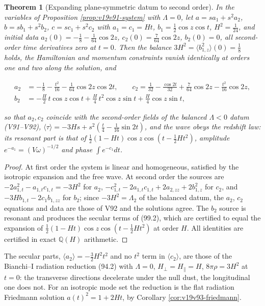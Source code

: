 \documentclass[11pt]{article}
\newtheorem{theorem}{Theorem}[section]
\theoremstyle{remark}
\begin{document}
\begin{theorem}[Expanding plane-symmetric datum to second order]
\label{thm:v19v96-evolution}
In the variables of Proposition \ref{prop:v19v91-system} with
\(\Lambda=0\), let \(a=sa_1+s^2a_2\), \(b=sb_1+s^2b_2\), \(c=sc_1+s^2c_2\)
with \(a_1=c_1=Ht\), \(b_1=\tfrac12\cos z\cos t\), \(H^2=\tfrac1{24}\),
and initial data \(a_2(0)=-\tfrac18-\tfrac1{64}\cos2z\),
\(c_2(0)=\tfrac7{64}\cos2z\), \(b_2(0)=0\), all second-order time
derivatives zero at \(t=0\).  Then the balance \(3H^2=\langle b_{1,z}^2\rangle(0)=\tfrac18\)
holds, the Hamiltonian and momentum constraints vanish identically at
orders one and two along the solution, and

\[
\begin{aligned}
 a_2&=-\frac18-\frac{t^2}{16}-\frac1{64}\cos2z\cos2t,\qquad
 c_2=\frac1{32}-\frac{\cos2t}{32}+\frac7{64}\cos2z-\frac{t^2}{16}\cos2z,\\
 b_2&=-\frac H2\,t\cos z\cos t+\frac H4\,t^2\cos z\sin t+\frac H4\cos z\sin t,
\end{aligned}                                                          \tag{99.2}
\]

so that \(a_2,c_2\) coincide with the second-order fields of the
balanced \(\Lambda<0\) datum (V91--V92), \(\langle\tau\rangle=-3Hs+s^2(\tfrac t4-\tfrac1{16}\sin2t)\),
and the wave obeys the redshift law: its resonant part is that of
\(\tfrac12(1-Ht)\cos z\cos(t-\tfrac12Ht^2)\), amplitude
\(e^{-a_1}=(V\omega)^{-1/2}\) and phase \(\int e^{-c_1}dt\).
\end{theorem}

\begin{proof}
At first order the system is linear and homogeneous, satisfied by
the isotropic expansion and the free wave.  At second order the
sources are \(-2a_{1,t}^2-a_{1,t}c_{1,t}=-3H^2\) for \(a_2\),
\(-c_{1,t}^2-2a_{1,t}c_{1,t}+2a_{2,zz}+2b_{1,z}^2\) for \(c_2\), and
\(-3Hb_{1,t}-2c_1b_{1,zz}\) for \(b_2\); since \(-3H^2=\Lambda_2\) of
the balanced datum, the \(a_2\), \(c_2\) equations and data are those
of V92 and the solutions agree.  The \(b_2\) source is resonant and
produces the secular terms of (99.2), which are certified to equal
the expansion of \(\tfrac12(1-Ht)\cos z\cos(t-\tfrac12Ht^2)\) at order
\(H\).  All identities are certified in exact \(\mathbb Q(H)\)
arithmetic.
\end{proof}

The secular parts, \(\langle a_2\rangle=-\tfrac32H^2t^2\) and no
\(t^2\) term in \(\langle c_2\rangle\), are those of the Bianchi--I
radiation reduction (94.2) with \(\Lambda=0\), \(H_\perp=H_\parallel=H\),
\(8\pi\rho=3H^2\) at \(t=0\): the transverse directions decelerate
under the null dust, the longitudinal one does not.  For an
isotropic mode set the reduction is the flat radiation Friedmann
solution \(a(t)^2=1+2Ht\), by Corollary \ref{cor:v19v93-friedmann}.
\end{document}
